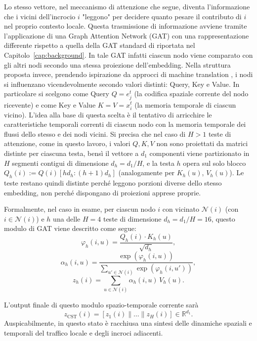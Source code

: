 Lo stesso vettore, nel meccanismo di attenzione che segue, diventa l'informazione che i vicini dell'incrocio $i$ "leggono"
per decidere quanto pesare il contributo di $i$ nel proprio contesto locale. Questa trasmissione di informazione avviene
tramite l'applicazione di una Graph Attention Network (GAT) con una rappresentazione differente rispetto a
quella della GAT standard di \citet{velickovic2018gat} riportata nel Capitolo~\ref{cap:background}.
In tale GAT infatti ciascun nodo viene comparato con gli altri nodi secondo una stessa proiezione dell'embedding.
Nella struttura proposta invece, prendendo ispirazione da approcci di machine translation \citep{vaswani2017attention}, i nodi si influenzano vicendevolmente secondo valori distinti: Query, Key e Value.
In particolare si scelgono come Query $Q=e_j^t$ (la codifica spaziale corrente del nodo ricevente) e come Key e Value $K=V=x_i^t$ (la memoria temporale di ciascun vicino).
L'idea alla base di questa scelta è il tentativo di arricchire le caratteristiche temporali correnti di ciascun nodo con la memoria temporale dei flussi dello stesso e dei nodi vicini.
Si precisa che nel caso di $H>1$ teste di attenzione, come in questo lavoro, i valori $Q,K,V$ non sono proiettati da matrici distinte per ciascuna testa, bensì
il vettore a $d_1$ componenti viene partizionato in $H$ segmenti contigui di dimensione $d_h = d_1/H$, e la testa $h$ opera sul solo blocco $Q_h(i) := Q(i)[h d_h : (h{+}1)d_h]$ (analogamente per $K_h(u)$, $V_h(u)$).
Le teste restano quindi distinte perché leggono porzioni diverse dello stesso embedding, non perché dispongano di proiezioni apprese proprie.

Formalmente, nel caso in esame, per ciascun nodo $i$ con vicinato $\mathcal{N}(i)$ (con $i\in \mathcal{N}(i)$) e $h$ una delle $H=4$ teste di dimensione $d_h = d_1/H = 16$, questo modulo di GAT viene descritto come segue:
\begin{equation}
  \varphi_h(i,u) = \frac{Q_h(i) \cdot K_h(u)}{\sqrt{d_h}} ,
  \label{eq:stgat-attn}
\end{equation}
\[ \alpha_h(i,u) = \frac{\exp(\varphi_h(i,u))}{\sum_{u' \in \mathcal{N}(i)} \exp(\varphi_h(i,u'))}, \]
\begin{equation}
  z_h(i) = \sum_{u \in \mathcal{N}(i)} \alpha_h(i,u)\, V_h(u) .
  \label{eq:stgat-z}
\end{equation}

L'output finale di questo modulo spazio-temporale corrente sarà
\begin{equation}
  z_{\mathrm{CST}}(i) = [z_1(i) \| \dots \| z_H(i)] \in \mathbb{R}^{d_1}.
  \label{eq:stgat-cst-output}
\end{equation}
Auspicabilmente, in questo stato è racchiusa una sintesi delle dinamiche spaziali e temporali del traffico locale e degli incroci adiacenti.


